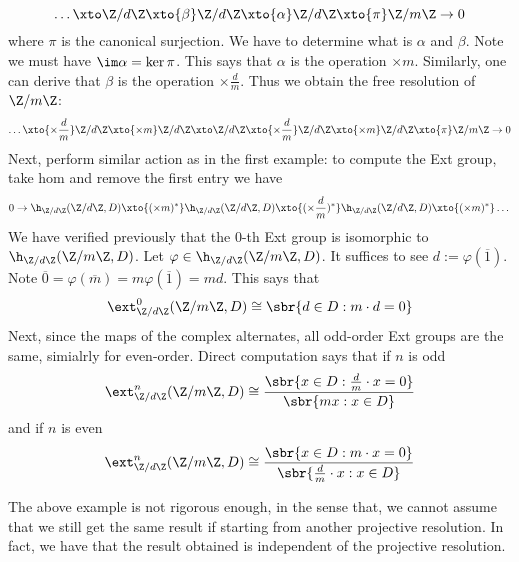 \begin{ex}
\begin{enumerate}
    \[\dots \xto \Z/d\Z \xto{\beta} \Z/d\Z \xto{\alpha} \Z/d\Z \xto{\pi} \Z/m\Z \to 0\]
	where $\pi$ is the canonical surjection. We have to determine what is $\alpha$ and $\beta$. Note we must have $\im\alpha = \ker \pi$. This says that $\alpha$ is the operation $\times m$. Similarly, one can derive that $\beta$ is the operation $\times \frac{d}{m}$. Thus we obtain the free resolution of $\Z/m\Z$:
	 \[\dots \xto{\times \frac{d}{m}} \Z/d\Z \xto{\times m} \Z/d\Z \xto \Z/d\Z \xto{\times \frac{d}{m}} \Z/d\Z \xto{\times m} \Z/d\Z \xto{\pi} \Z/m\Z \to 0\]
	 Next, perform similar action as in the first example: to compute the Ext group, take hom and remove the first entry we have 
	 \[0 \to \h_{\Z/d\Z}(\Z/d\Z, D) \xto{(\times m)^*} \h_{\Z/d\Z}(\Z/d\Z, D) \xto{(\times \frac{d}{m})^*}\h_{\Z/d\Z}(\Z/d\Z, D) \xto{(\times m)^*}\dots\]
	 We have verified previously that the $0$-th Ext group is isomorphic to $\h_{\Z/d\Z}(\Z/m\Z, D)$. Let $\varphi\in \h_{\Z/d\Z}(\Z/m\Z, D)$. It suffices to see $d:= \varphi(\overline{1})$. Note $\overline{0} = \varphi(\overline{m}) = m \varphi(\overline{1}) = md$. This says that 
	 \[\ext_{\Z/d\Z}^0(\Z/m\Z, D)\cong \sbr{d\in D: m\cdot d = 0}\]
	 Next, since the maps of the complex alternates, all odd-order Ext groups are the same, simialrly for even-order. Direct computation says that if $n$ is odd
	 \[\ext^n_{\Z/d\Z}(\Z/m\Z, D) \cong \frac{\sbr{x\in D: \frac{d}{m}\cdot x = 0}}{\sbr{mx: x\in D}}\]
	 and if $n$ is even
	 \[\ext^n_{\Z/d\Z}(\Z/m\Z, D) \cong \frac{\sbr{x\in D:m\cdot x = 0}}{\sbr{\frac{d}{m} \cdot x:x\in D}}\]
    \end{enumerate}
\end{ex}

\medskip

\begin{re}
    The above example is not rigorous enough, in the sense that, we cannot assume that we still get the same result if starting from another projective resolution. In fact, we have that the result obtained is independent of the projective resolution.
\end{re}

\medskip

